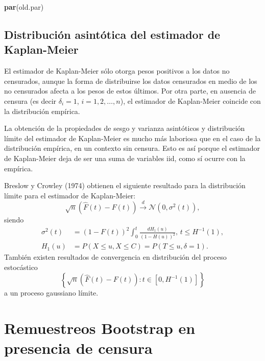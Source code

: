 \documentclass[
]{book}
\newenvironment{Shaded}{\begin{snugshade}}{\end{snugshade}}
\newcommand{\KeywordTok}[1]{\textcolor[rgb]{0.13,0.29,0.53}{\textbf{#1}}}
\newcommand{\NormalTok}[1]{#1}
\theoremstyle{break}
\theoremstyle{definition}
\theoremstyle{definition}
\theoremstyle{definition}
\theoremstyle{remark}
\begin{document}
\begin{Shaded}
\begin{Highlighting}[]
\KeywordTok{par}\NormalTok{(old.par)}
\end{Highlighting}
\end{Shaded}

\hypertarget{distribuciuxf3n-asintuxf3tica-del-estimador-de-kaplan-meier}{%
\subsection{Distribución asintótica del estimador de Kaplan-Meier}\label{distribuciuxf3n-asintuxf3tica-del-estimador-de-kaplan-meier}}

El estimador de Kaplan-Meier sólo otorga pesos positivos a los datos no
censurados, aunque la forma de distribuirse los datos censurados en
medio de los no censurados afecta a los pesos de estos últimos. Por otra
parte, en ausencia de censura (es decir \(\delta _i=1\),
\(i=1,2,\ldots ,n\)), el estimador de Kaplan-Meier coincide con la
distribución empírica.

La obtención de la propiedades de sesgo y varianza asintóticos y
distribución límite del estimador de Kaplan-Meier es mucho más laboriosa
que en el caso de la distribución empírica, en un contexto sin censura.
Esto es así porque el estimador de Kaplan-Meier deja de ser una suma de
variables iid, como sí ocurre con la empírica.

Breslow y Crowley (1974) obtienen el siguiente resultado para la distribución
límite para el estimador de Kaplan-Meier:
\[\sqrt{n}\left( \hat{F}\left( t \right) -F\left( t \right) \right) 
\overset{d}{\longrightarrow} \mathcal{N}\left( 0,\sigma^2\left( t \right)
\right),\]
siendo
\[\begin{aligned}
\sigma^2\left( t \right) &= \left( 1-F\left( t \right) \right)
^2\int_{0}^{t}\frac{dH_1\left( u \right)}{\left( 1-H\left( u \right)
 \right)^2}\text{, }t\leq H^{-1}(1) , \\
H_1\left( u \right) &= P\left( X\leq u,X\leq C \right) =P\left( T\leq
u,\delta =1 \right).
\end{aligned}\]
También existen resultados de convergencia en distribución del
proceso estocástico
\[\left\{ \sqrt{n}\left( \hat{F}\left( t \right) - F\left( t \right)
 \right) : t \in \left[ 0,H^{-1}(1) \right] \right\}\]
a un proceso gaussiano límite.

\hypertarget{remuestreos-bootstrap-en-presencia-de-censura}{%
\section{Remuestreos Bootstrap en presencia de censura}\label{remuestreos-bootstrap-en-presencia-de-censura}}
\end{document}
